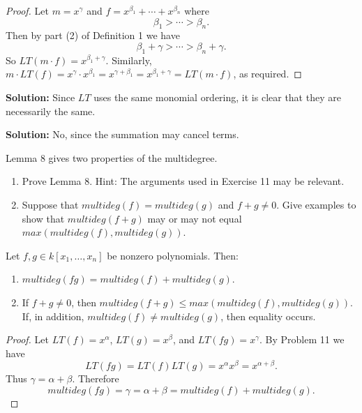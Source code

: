 \begin{proof}
    Let $m = x^\gamma$ and $f = x^{\beta_1} + \cdots + x^{\beta_n}$ where 
    \[
    \beta_1 > \cdots > \beta_n.
    \]
    Then by part (2) of Definition 1 we have 
    \[
    \beta_1 + \gamma > \cdots > \beta_n + \gamma.
    \]
    So $LT(m \cdot f) = x^{\beta_1 + \gamma}$.
    Similarly, $m \cdot LT(f) = x^\gamma \cdot x^{\beta_1}
    = x^{\gamma + \beta_1} = x^{\beta_1 + \gamma}
    = LT(m \cdot f)$, as required.
\end{proof}

\textbf{Solution: } Since $LT$ uses the same monomial ordering,
it is clear that they are necessarily the same.

\textbf{Solution: } No, since the summation may cancel terms.


\begin{tcolorbox}[title=Problem 12, breakable]
    Lemma 8 gives two properties of the multidegree.
    \begin{enumerate}
        \item Prove Lemma 8. Hint: The arguments used in Exercise 11 may be relevant.
        \item Suppose that $multideg(f) = multideg(g)$ and $f + g \ne 0$.
        Give examples to show that $multideg(f + g)$ may or may not equal $max(multideg(f), multideg(g))$.
    \end{enumerate}
\end{tcolorbox}

\begin{theorem}
    Let $f, g \in k[x_1, \ldots, x_n]$ be nonzero polynomials.
    Then:
    \begin{enumerate}
        \item $multideg(fg) = multideg(f) + multideg(g)$.
        \item If $f + g \ne 0$, then $multideg(f + g) \le max(multideg(f), multideg(g))$.
        If, in addition, $multideg(f) \ne multideg(g)$, then equality occurs.
    \end{enumerate}
\end{theorem}

\begin{proof}
    Let $LT(f) = x^\alpha$, $LT(g) = x^\beta$, and $LT(fg) = x^\gamma$.
    By Problem 11 we have 
    \[
    LT(fg) = LT(f)LT(g) = x^\alpha x^\beta = x^{\alpha + \beta}.
    \]
    Thus $\gamma = \alpha + \beta$. Therefore
    \[
    multideg(fg) = \gamma = \alpha + \beta 
    = multideg(f) + multideg(g).
    \]
\end{proof}

